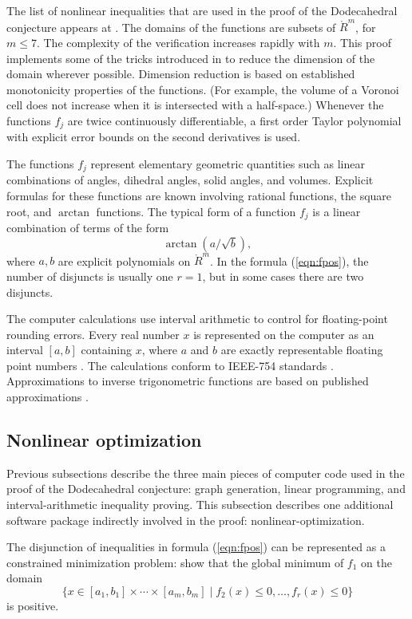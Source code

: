 \documentclass{article} %
\begin{document}
The list of nonlinear inequalities that are used in the proof of the
Dodecahedral conjecture appears at \cite{McLaughlin:2008:KeplerCode}.
The domains of the functions are subsets of $\ring{R}^m$, for $m\le
7$. The complexity of the verification increases rapidly with $m$.
This proof implements some of the tricks introduced in
\cite{Hales:2006:DCG} to reduce the dimension of the domain wherever
possible. Dimension reduction is based on established monotonicity
properties of the functions. (For example, the volume of a Voronoi
cell does not increase when it is intersected with a half-space.)
Whenever the functions $f_j$ are twice continuously differentiable, a
first order Taylor polynomial with explicit error bounds on the second
derivatives is used. 

The functions $f_j$ represent elementary
geometric quantities such as linear combinations of angles, dihedral
angles, solid angles, and volumes. Explicit formulas for these
functions are known involving rational functions, the square root, and
$\arctan$ functions. The typical form of a function $f_j$ is a linear
combination of terms of the form
$$
\arctan(a/\sqrt{b}),
$$
where $a,b$ are explicit polynomials on $\ring{R}^m$. In the formula
(\ref{eqn:fpos}), the number of disjuncts is usually one $r=1$, but in
some cases there are two disjuncts.
 
The computer calculations use interval arithmetic to control for
floating-point rounding errors. Every real number $x$ is represented
on the computer as an interval $[a,b]$ containing $x$, where $a$ and
$b$ are exactly representable floating point numbers
\cite{Alefeld:1983:Interval, Press:1992:NumericalRecipes}. The
calculations conform to IEEE-754 standards \cite{IEEE:1985:IEE754}.
Approximations to inverse trigonometric functions are based on
published approximations \cite{Hart:1968:Approximations}.

\subsection{Nonlinear optimization}

Previous subsections describe the three main pieces of computer code
used in the proof of the Dodecahedral conjecture: graph generation,
linear programming, and interval-arithmetic inequality proving. This
subsection describes one additional software package indirectly
involved in the proof: nonlinear-optimization. 

The disjunction of inequalities in formula (\ref{eqn:fpos}) can
be represented as a constrained minimization problem: show that
the global minimum of $f_1$ on the domain
$$
\{x\in[a_1,b_1]\times\cdots\times[a_m,b_m] \mid  f_2(x)\le 0,\ldots,
  f_r(x)\le 0 \}
$$
is positive. 
\end{document}

